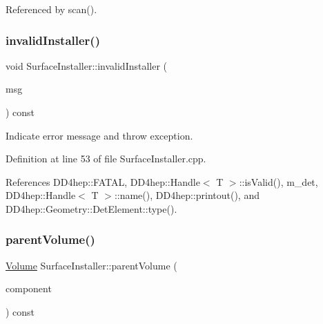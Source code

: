 Referenced by scan().

\hypertarget{class_d_d4hep_1_1_surface_installer_af6761e35e5d044953ef55b08771d4be7}{}\label{class_d_d4hep_1_1_surface_installer_af6761e35e5d044953ef55b08771d4be7} 
\subsubsection{\texorpdfstring{invalid\+Installer()}{invalidInstaller()}}
{\footnotesize\ttfamily void Surface\+Installer\+::invalid\+Installer (\begin{DoxyParamCaption}\item[{const std\+::string \&}]{msg }\end{DoxyParamCaption}) const}



Indicate error message and throw exception. 



Definition at line 53 of file Surface\+Installer.\+cpp.



References D\+D4hep\+::\+F\+A\+T\+AL, D\+D4hep\+::\+Handle$<$ T $>$\+::is\+Valid(), m\+\_\+det, D\+D4hep\+::\+Handle$<$ T $>$\+::name(), D\+D4hep\+::printout(), and D\+D4hep\+::\+Geometry\+::\+Det\+Element\+::type().

\hypertarget{class_d_d4hep_1_1_surface_installer_ad8f0a56b5a2dd3c293316a1415c24e59}{}\label{class_d_d4hep_1_1_surface_installer_ad8f0a56b5a2dd3c293316a1415c24e59} 
\subsubsection{\texorpdfstring{parent\+Volume()}{parentVolume()}}
{\footnotesize\ttfamily \hyperlink{class_d_d4hep_1_1_surface_installer_a32a727cbf3cfca5204b7eaf344a5304f}{Volume} Surface\+Installer\+::parent\+Volume (\begin{DoxyParamCaption}\item[{\hyperlink{class_d_d4hep_1_1_surface_installer_ab88f41bd9efd54b4b67baee892bfa926}{Det\+Element}}]{component }\end{DoxyParamCaption}) const}




